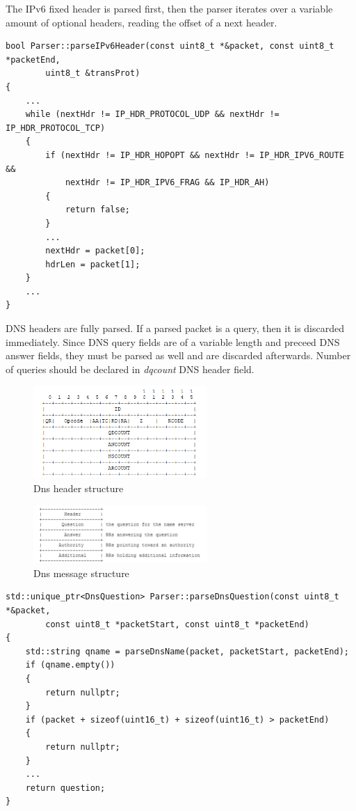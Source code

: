 \documentclass[a4paper, 12pt]{article}
\begin{document}
The IPv6 fixed header is parsed first, then the parser iterates over a variable amount of optional headers, reading the offset of a next header.
\begin{lstlisting}
bool Parser::parseIPv6Header(const uint8_t *&packet, const uint8_t *packetEnd,
        uint8_t &transProt)
{
    ...
    while (nextHdr != IP_HDR_PROTOCOL_UDP && nextHdr != IP_HDR_PROTOCOL_TCP)
    {
        if (nextHdr != IP_HDR_HOPOPT && nextHdr != IP_HDR_IPV6_ROUTE &&
            nextHdr != IP_HDR_IPV6_FRAG && IP_HDR_AH)
        {
            return false;
        }
        ...
        nextHdr = packet[0];
        hdrLen = packet[1];
    }
    ...
}
\end{lstlisting}
DNS headers are fully parsed. If a parsed packet is a query, then it is discarded immediately.
\newpage
Since DNS query fields are of a variable length and preceed DNS answer fields, they must be parsed as well and are discarded afterwards. Number of queries should be declared in \textit{dqcount} DNS header field.
\begin{figure}[h]
    \centering
    \includegraphics[width=250px]{dns_header.png}
    \caption{Dns header structure}
    \label{fig:dns header structure}
\end{figure}
\begin{figure}[h]
    \centering
    \includegraphics[width=250px]{dns_message.png}
    \caption{Dns message structure}
    \label{fig:dns message structure}
\end{figure}
\begin{lstlisting}
std::unique_ptr<DnsQuestion> Parser::parseDnsQuestion(const uint8_t *&packet,
        const uint8_t *packetStart, const uint8_t *packetEnd)
{
    std::string qname = parseDnsName(packet, packetStart, packetEnd);
    if (qname.empty())
    {
        return nullptr;
    }
    if (packet + sizeof(uint16_t) + sizeof(uint16_t) > packetEnd)
    {
        return nullptr;
    }
    ...
    return question;
}
\end{lstlisting}
\end{document}
